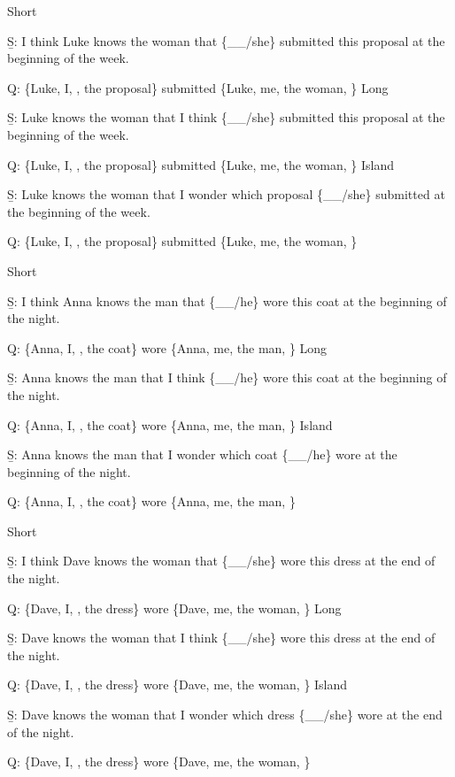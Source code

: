 \pex 
\a Short\par\nobreak
\beginsubsub 
\b{S:} I think Luke knows the woman that \{\_\_/she\} submitted this proposal at the beginning of the week.\par\nobreak
\b{Q:} \{Luke, I, , the proposal\} submitted \{Luke, me, the woman, \}
\endsubsub
\a Long\par\nobreak
\beginsubsub
\b{S:} Luke knows the woman that I think \{\_\_/she\} submitted this proposal at the beginning of the week.\par\nobreak
\b{Q:} \{Luke, I, , the proposal\} submitted \{Luke, me, the woman, \}
\endsubsub
\a Island\par\nobreak
\beginsubsub
\b{S:} Luke knows the woman that I wonder which proposal \{\_\_/she\} submitted at the beginning of the week.\par\nobreak
\b{Q:} \{Luke, I, , the proposal\} submitted \{Luke, me, the woman, \}
\endsubsub
\xe

\pex 
\a Short\par\nobreak
\beginsubsub 
\b{S:} I think Anna knows the man that \{\_\_/he\} wore this coat at the beginning of the night.\par\nobreak
\b{Q:} \{Anna, I, , the coat\} wore \{Anna, me, the man, \}
\endsubsub
\a Long\par\nobreak
\beginsubsub
\b{S:} Anna knows the man that I think \{\_\_/he\} wore this coat at the beginning of the night.\par\nobreak
\b{Q:} \{Anna, I, , the coat\} wore \{Anna, me, the man, \}
\endsubsub
\a Island\par\nobreak
\beginsubsub
\b{S:} Anna knows the man that I wonder which coat \{\_\_/he\} wore at the beginning of the night.\par\nobreak
\b{Q:} \{Anna, I, , the coat\} wore \{Anna, me, the man, \}
\endsubsub
\xe

\pex 
\a Short\par\nobreak
\beginsubsub
\b{S:} I think Dave knows the woman that \{\_\_/she\} wore this dress at the end of the night.\par\nobreak
\b{Q:} \{Dave, I, , the dress\} wore \{Dave, me, the woman, \}
\endsubsub
\a Long\par\nobreak
\beginsubsub
\b{S:} Dave knows the woman that I think \{\_\_/she\} wore this dress at the end of the night.\par\nobreak
\b{Q:} \{Dave, I, , the dress\} wore \{Dave, me, the woman, \}
\endsubsub
\a Island\par\nobreak
\beginsubsub
\b{S:} Dave knows the woman that I wonder which dress \{\_\_/she\} wore at the end of the night.\par\nobreak
\b{Q:} \{Dave, I, , the dress\} wore \{Dave, me, the woman, \}
\endsubsub
\xe

